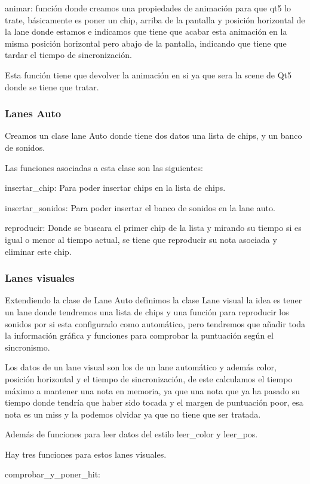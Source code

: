 \documentclass[a4paper,11pt,oneside]{book}
\begin{document}
animar: función donde creamos una propiedades de animación para que qt5 lo trate, básicamente es poner un chip, arriba de la pantalla y posición horizontal de la lane donde estamos e indicamos que tiene que acabar esta animación en la misma posición horizontal pero abajo de la pantalla, indicando que tiene que tardar el tiempo de sincronización.

Esta función tiene que devolver la animación en si ya que sera la scene de Qt5 donde se tiene que tratar.

\subsubsection{Lanes Auto}
Creamos un clase lane Auto donde tiene dos datos una lista de chips, y un banco de sonidos.

Las funciones asociadas a esta clase son las siguientes:

insertar\_chip: Para poder insertar chips en la lista de chips.

insertar\_sonidos: Para poder insertar el banco de sonidos en la lane auto.

reproducir: Donde se buscara el primer chip de la lista y mirando su tiempo si es igual o menor al tiempo actual, se tiene que reproducir su nota asociada y eliminar este chip.

\subsubsection{Lanes visuales}
Extendiendo la clase de Lane Auto definimos la clase Lane visual la idea es tener un lane donde tendremos una lista de chips y una función para reproducir los sonidos por si esta configurado como automático, pero tendremos que añadir toda la información gráfica y funciones para comprobar la puntuación según el sincronismo.

Los datos de un lane visual son los de un lane automático y además color, posición horizontal y el tiempo de sincronización, de este calculamos el tiempo máximo a mantener una nota en memoria, ya que una nota que ya ha pasado su tiempo donde tendría que haber sido tocada y el margen de puntuación poor, esa nota es un miss y la podemos olvidar ya que no tiene que ser tratada.


Además de funciones para leer datos del estilo leer\_color y leer\_pos.

Hay tres funciones para estos lanes visuales.

comprobar\_y\_poner\_hit:
\end{document}

